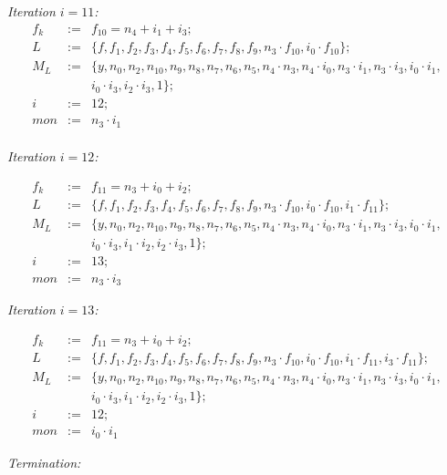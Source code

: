 \begin{Example}
	{\it Iteration $i=11$:}
	\begin{eqnarray}
		f_{k}&:=&f_{10}=n_4+i_1+i_3; \nonumber \\
		L&:=&\{ f,f_1,f_{2},f_{3},f_{4},f_{5},f_{6},f_{7},f_{8},f_{9},n_3 \cdot f_{10}, i_{0} \cdot f_{10} \}; \nonumber \\
		M_{L}&:=&\{ y,n_0,n_2,n_{10},n_9,n_8,n_7,n_6,n_5,n_4\cdot n_3,n_4\cdot i_0,n_3\cdot i_1,n_3\cdot i_3,i_0\cdot i_1,\nonumber \\
		&{}&i_0\cdot i_3, i_2\cdot i_3,1\}; \nonumber \\
		i&:=&12;  \nonumber \\
		mon&:=& n_3\cdot i_1\nonumber 
	\end{eqnarray}\\
	
	{\it Iteration $i=12$:}
	
	\begin{eqnarray}
		f_{k}&:=&f_{11}=n_3+i_0+i_2; \nonumber \\
		L&:=&\{ f,f_1,f_{2},f_{3},f_{4},f_{5},f_{6},f_{7},f_{8},f_{9},n_3 \cdot f_{10}, i_{0} \cdot f_{10},i_1 \cdot f_{11} \}; \nonumber \\
		M_{L}&:=&\{ y,n_0,n_2,n_{10},n_9,n_8,n_7,n_6,n_5,n_4\cdot n_3,n_4\cdot i_0,n_3\cdot i_1,n_3\cdot i_3,i_0\cdot i_1,  \nonumber \\
		&{}&i_0\cdot i_3, i_1\cdot i_2,i_2\cdot i_3,1\}; \nonumber \\
		i&:=&13;  \nonumber \\
		mon&:=& n_3\cdot i_3\nonumber 
	\end{eqnarray}
	
	{\it Iteration $i=13$:}
	
	\begin{eqnarray}
		f_{k}&:=&f_{11}=n_3+i_0+i_2; \nonumber \\
		L&:=&\{ f,f_1,f_{2},f_{3},f_{4},f_{5},f_{6},f_{7},f_{8},f_{9},n_3 \cdot f_{10}, i_{0} \cdot f_{10},i_1 \cdot f_{11}, i_3 \cdot f_{11}\}; \nonumber \\
		M_{L}&:=&\{ y,n_0,n_2,n_{10},n_9,n_8,n_7,n_6,n_5,n_4\cdot n_3,n_4\cdot i_0, n_3\cdot i_1,n_3\cdot i_3,i_0\cdot i_1,\nonumber \\
		&{}&i_0\cdot i_3, i_1\cdot i_2,i_2\cdot i_3,1\}; \nonumber \\
		i&:=&12;  \nonumber \\
		mon&:=& i_0\cdot i_1 \nonumber 
	\end{eqnarray}
	
	{\it Termination:}
	

\end{Example}
